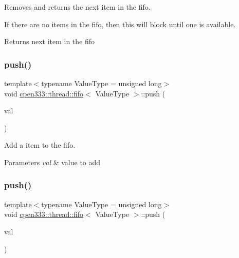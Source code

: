 Removes and returns the next item in the fifo. 

If there are no items in the fifo, then this will block until one is available.

\begin{DoxyReturn}{Returns}
next item in the fifo 
\end{DoxyReturn}
\mbox{\label{classcpen333_1_1thread_1_1fifo_a9b2288b7fd27065b58060e225601e550}} 
\subsubsection{\texorpdfstring{push()}{push()}\hspace{0.1cm}{\footnotesize\ttfamily [1/2]}}
{\footnotesize\ttfamily template$<$typename Value\+Type  = unsigned long$>$ \\
void \hyperlink{classcpen333_1_1thread_1_1fifo}{cpen333\+::thread\+::fifo}$<$ Value\+Type $>$\+::push (\begin{DoxyParamCaption}\item[{const Value\+Type \&}]{val }\end{DoxyParamCaption})\hspace{0.3cm}{\ttfamily [inline]}}



Add a item to the fifo. 


\begin{DoxyParams}{Parameters}
{\em val} & value to add \\
\hline
\end{DoxyParams}
\mbox{\label{classcpen333_1_1thread_1_1fifo_a055c1d083c7e8b9b60d4b503780357ff}} 
\subsubsection{\texorpdfstring{push()}{push()}\hspace{0.1cm}{\footnotesize\ttfamily [2/2]}}
{\footnotesize\ttfamily template$<$typename Value\+Type  = unsigned long$>$ \\
void \hyperlink{classcpen333_1_1thread_1_1fifo}{cpen333\+::thread\+::fifo}$<$ Value\+Type $>$\+::push (\begin{DoxyParamCaption}\item[{Value\+Type \&\&}]{val }\end{DoxyParamCaption})\hspace{0.3cm}{\ttfamily [inline]}}



